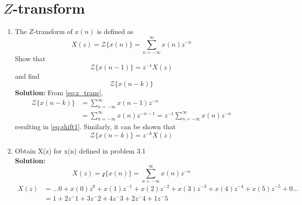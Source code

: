 \documentclass[journal,12pt,twocolumn]{IEEEtran}
\renewcommand\thesection{\arabic{section}}
\newcommand{\solution}{\noindent \textbf{Solution: }}
\numberwithin{equation}{section}
\renewcommand\thesection{\arabic{section}}
\begin{document}
\section{$Z$-transform}
\begin{enumerate}[label=\thesection.\arabic*]
\item The $Z$-transform of $x(n)$ is defined as
%
\begin{equation}
\label{eq:z_trans}
X(z)={\mathcal {Z}}\{x(n)\}=\sum _{n=-\infty }^{\infty }x(n)z^{-n}
\end{equation}
%
Show that
\begin{equation}
\label{eq:shift1}
{\mathcal {Z}}\{x(n-1)\} = z^{-1}X(z)
\end{equation}
and find
\begin{equation}
	{\mathcal {Z}}\{x(n-k)\} 
\end{equation}
\solution From \eqref{eq:z_trans},
\begin{align}
{\mathcal {Z}}\{x(n-k)\} &=\sum _{n=-\infty }^{\infty }x(n-1)z^{-n}
\\
&=\sum _{n=-\infty }^{\infty }x(n)z^{-n-1} = z^{-1}\sum _{n=-\infty }^{\infty }x(n)z^{-n}
\end{align}
resulting in \eqref{eq:shift1}. Similarly, it can be shown that
%
\begin{equation}
\label{eq:z_trans_shift}
	{\mathcal {Z}}\{x(n-k)\} = z^{-k}X(z)
\end{equation}
\item Obtain X(z) for x(n) defined in problem 3.1\\
\solution $$X(z)={\mathcal {z}}\{x(n)\}=\sum_{n=-\infty}^{\infty}x(n)z^{-n}$$
\begin{align*}
X(z) &= ...0+x(0)z^{0}+x(1)z^{-1}+x(2)z^{-2}+x(3)z^{-3}+x(4)z^{-4}+x(5)z^{-5}+0...\\
     &= 1+2z^-1+3z^-2+4z^-3+2z^-4+1z^-5\\
\end{align*}


\end{enumerate}
\end{document}
